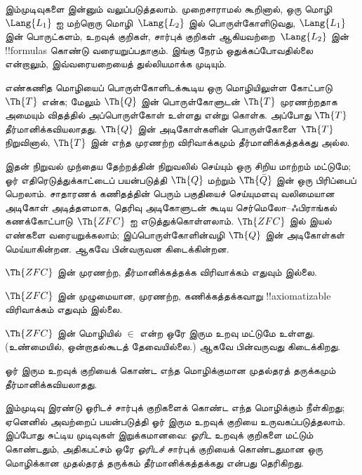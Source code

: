 \documentclass[../../../include/open-logic-section]{subfiles}
\begin{document}



இம்முடிவுகளை இன்னும் வலுப்படுத்தலாம். முறைசாராமல் கூறினால்,
ஒரு மொழி~$\Lang{L_1}$ ஐ மற்றொரு மொழி~$\Lang{L_2}$ இல் பொருள்கோளிடுவது,
$\Lang{L_1}$ இன் பொருட்களம், உறவுக் குறிகள், சார்புக் குறிகள்
ஆகியவற்றை~$\Lang{L_2}$ இன் !!{formula}s கொண்டு வரையறுப்பதாகும்.
இங்கு நேரம் ஒதுக்கப்போவதில்லை என்றாலும், இவ்வரையறையைத் துல்லியமாக்க
முடியும்.

\begin{thm}
  எண்கணித மொழியைப் பொருள்கோளிடக்கூடிய ஒரு மொழியிலுள்ள
  கோட்பாடு~$\Th{T}$ என்க; மேலும் $\Th{Q}$ இன் பொருள்கோளுடன்
  $\Th{T}$ முரணற்றதாக அமையும் விதத்தில் அப்பொருள்கோள் உள்ளது என்று கொள்க.
  அப்போது $\Th{T}$ தீர்மானிக்கவியலாதது. $\Th{Q}$ இன் அடிகோள்களின்
  பொருள்கோளை~$\Th{T}$ நிறுவினால், $\Th{T}$ இன் எந்த முரணற்ற
  விரிவாக்கமும் தீர்மானிக்கத்தக்கது அல்ல.
\end{thm}

இதன் நிறுவல் முந்தைய தேற்றத்தின் நிறுவலில் செய்யும் ஒரு சிறிய மாற்றம்
மட்டுமே; ஓர் எதிரெடுத்துக்காட்டைப் பயன்படுத்தி $\Th{Q}$ மற்றும்
$\Th{\bar Q}$ இன் ஒரு பிரிப்பைப் பெறலாம். சாதாரணக் கணிதத்தின் பெரும்
பகுதியைச் செய்யுமளவு வலிமையான அடிகோள் அடித்தளமாக, தெரிவு அடிகோளுடன் கூடிய
செர்மெலோ--ஃபிராங்கல் கணக்கோட்பாடு~$\Th{ZFC}$ ஐ எடுத்துக்கொள்ளலாம்.
$\Th{ZFC}$ இல் இயல் எண்களை வரையறுக்கலாம்; இப்பொருள்கோளின்வழி
$\Th{Q}$ இன் அடிகோள்கள் மெய்யாகின்றன. ஆகவே பின்வருவன கிடைக்கின்றன.

\begin{cor}
$\Th{ZFC}$ இன் முரணற்ற, தீர்மானிக்கத்தக்க விரிவாக்கம் எதுவும் இல்லை.
\end{cor}

\begin{cor}
$\Th{ZFC}$ இன் முழுமையான, முரணற்ற, கணிக்கத்தக்கவாறு
!!{axiomatizable} விரிவாக்கம் எதுவும் இல்லை.
\end{cor}

$\Th{ZFC}$ இன் மொழியில் $\in$ என்ற ஒரே இரும உறவு மட்டுமே உள்ளது.
(உண்மையில், ஒன்றாதல்கூடத் தேவையில்லை.) ஆகவே பின்வருவது கிடைக்கிறது.

\begin{cor}
ஓர் இரும உறவுக் குறியைக் கொண்ட எந்த மொழிக்குமான முதல்தரத் தருக்கமும்
தீர்மானிக்கவியலாதது.
\end{cor}

இம்முடிவு இரண்டு ஓரிடச் சார்புக் குறிகளைக் கொண்ட எந்த மொழிக்கும்
நீள்கிறது; ஏனெனில் அவற்றைப் பயன்படுத்தி ஓர் இரும உறவுக் குறியை
உருவகப்படுத்தலாம். இப்போது சுட்டிய முடிவுகள் இறுக்கமானவை: \emph{ஓரிட}
உறவுக் குறிகளை மட்டும் கொண்டதும், அதிகபட்சம் ஒரே \emph{ஓரிடச்} சார்புக் குறியைக்
கொண்டதுமான ஒரு மொழிக்கான முதல்தரத் தருக்கம் தீர்மானிக்கத்தக்கது என்பது
தெரிகிறது.
\end{document}
